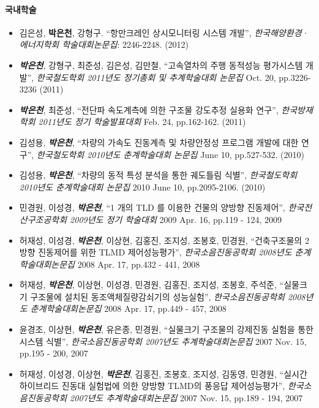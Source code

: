 \documentclass[]{article}
\providecommand{\tightlist}{%
  \setlength{\itemsep}{0pt}\setlength{\parskip}{0pt}}
\let\oldparagraph\paragraph
\renewcommand{\paragraph}[1]{\oldparagraph{#1}\mbox{}}
\begin{document}
\paragraph{국내학술}\label{uxad6duxb0b4uxd559uxc220}

\begin{itemize}
\tightlist
\item
  김은성, \textbf{박은천}, 강형구. ``항만크레인 상시모니터링 시스템 개발'', \emph{한국해양환경· 에너지학회 학술대회논문집}: 2246-2248. (2012)
\item
  \emph{\textbf{박은천}}, 강형구, 최준성, 김은성, 김만철, ``고속열차의 주행 동적성능 평가시스템 개발'', \emph{한국철도학회 2011년도 정기총회 및 추계학술대회 논문집} Oct. 20, pp.3226-3236 (2011)
\item
  \emph{\textbf{박은천}}, 최준성, ``전단파 속도계측에 의한 구조물 강도추정 실용화 연구'', \emph{한국방재학회 2011년도 정기 학술발표대회} Feb. 24, pp.162-162. (2011)
\item
  김성용, \emph{\textbf{박은천}}, ``차량의 가속도 진동계측 및 차량안정성 프로그램 개발에 대한 연구'', \emph{한국철도학회 2010년도 춘계학술대회 논문집} June 10, pp.527-532. (2010)
\item
  김성용, \emph{\textbf{박은천}}, ``차량의 동적 특성 분석을 통한 궤도틀림 식별'', \emph{한국철도학회 2010년도 춘계학술대회 논문집} 2010 June 10, pp.2095-2106. (2010)
\item
  민경원, 이성경, \emph{\textbf{박은천}}, ``1 개의 TLD 를 이용한 건물의 양방향 진동제어'', \emph{한국전산구조공학회 2009년도 정기 학술대회} 2009 Apr. 16, pp.119 - 124, 2009
\item
  허재성, 이성경, \emph{\textbf{박은천}}, 이상현, 김홍진, 조지성, 조봉호, 민경원, ``건축구조물의 2방향 진동제어를 위한 TLMD 제어성능평가'',
  \emph{한국소음진동공학회 2008년도 춘계학술대회논문집} 2008 Apr. 17, pp.432 - 441, 2008
\item
  허재성, \emph{\textbf{박은천}}, 이상현, 이성경, 민경원, 김홍진, 조지성, 조봉호, 주석준, ``실물크기 구조물에 설치된 동조액체질량감쇠기의
  성능실험'', \emph{한국소음진동공학회 2008년도 춘계학술대회논문집} 2008 Apr. 17, pp.449 - 457, 2008
\item
  윤경조, 이상현, \emph{\textbf{박은천}}, 유은종, 민경원, ``실물크기 구조물의 강제진동 실험을 통한 시스템 식별'', \emph{한국소음진동공학회 2007년도 추계학술대회논문집} 2007 Nov. 15, pp.195 - 200, 2007
\item
  허재성, 이성경, 이상현, \emph{\textbf{박은천}}, 김홍진, 조봉호, 조지성, 김동영, 민경원, ``실시간 하이브리드 진동대 실험법에 의한 양방향 TLMD의 풍응답 제어성능평가'', \emph{한국소음진동공학회 2007년도 추계학술대회논문집} 2007 Nov. 15, pp.189 - 194, 2007

\end{itemize}
\end{document}
